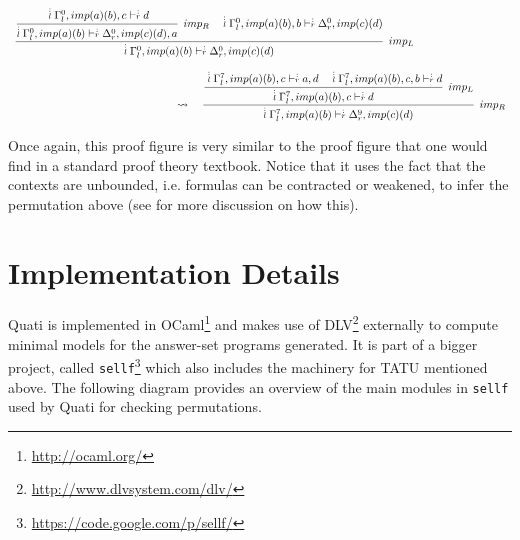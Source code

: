 \documentclass{llncs}
\newcommand{\ndots}[1]{\stackrel{\vcenter{\hbox{$\scriptstyle :$}\vskip-.35ex}}
   {\hbox {$ \scriptstyle {#1}$}}}
\begin{document}
{\scriptsize
\[
\begin{array}{ll}
\cfrac{\cfrac{ \ndots{l} \Gamma_{l}^{0}, imp (a) (b) , c \vdash  \ndots{r} d}
{ \ndots{l} \Gamma_{l}^{0}, imp (a) (b)  \vdash  \ndots{r} \Delta_{r}^{0}, imp (c) (d) , a} \;\; imp_{R}
\quad
 \ndots{l} \Gamma_{l}^{0}, imp (a) (b) , b \vdash  \ndots{r} \Delta_{r}^{0}, imp (c) (d) }
{ \ndots{l} \Gamma_{l}^{0}, imp (a) (b)  \vdash  \ndots{r} \Delta_{r}^{0}, imp (c) (d) } \;\; imp_{L}\\\\
\qquad \qquad \qquad \qquad \qquad \qquad \qquad \quad\rightsquigarrow\quad
\cfrac{\cfrac{ \ndots{l} \Gamma_{l}^{7}, imp (a) (b) , c \vdash  \ndots{r} a, d
\quad
 \ndots{l} \Gamma_{l}^{7}, imp (a) (b) , c, b \vdash  \ndots{r} d}
{ \ndots{l} \Gamma_{l}^{7}, imp (a) (b) , c \vdash  \ndots{r} d} \;\; imp_{L}}
{ \ndots{l} \Gamma_{l}^{7}, imp (a) (b)  \vdash  \ndots{r} \Delta_{r}^{9}, imp (c) (d) } \;\; imp_{R}
\end{array}
\]
}

Once again, this proof figure is very similar to the proof figure that one would find in a standard proof theory textbook.
Notice that it uses the fact that the contexts are unbounded, i.e. formulas can
be contracted or weakened, to infer the permutation above (see \cite{nigam13iclp} for 
more discussion on how this).

\section{Implementation Details}
\label{sec:impl}

Quati is implemented in OCaml\footnote{\url{http://ocaml.org/}} and makes use of
DLV\footnote{\url{http://www.dlvsystem.com/dlv/}} externally to compute minimal models for the
answer-set programs generated. It is part of a bigger project, called
\texttt{sellf}\footnote{\url{https://code.google.com/p/sellf/}} which also includes the
machinery for TATU mentioned above. The following diagram provides an overview of
the main modules in \texttt{sellf} used by Quati for checking permutations.
\end{document}
